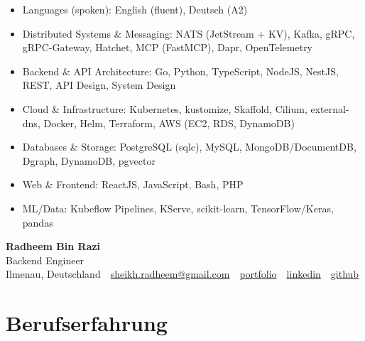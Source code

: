 \documentclass[10pt,a4paper]{resume}
\makeatletter
\newcommand{\Portfolio}{https://radheem.github.io/my-cv}
\newcommand{\PortfolioText}{portfolio}
\newcommand{\GitHub}{https://github.com/radheem}
\newcommand{\LinkedIn}{https://www.linkedin.com/in/radheem-razi}
\newcommand{\Email}{sheikh.radheem@gmail.com}
\makeatother
\begin{document}
\begin{itemize}[leftmargin=1.4em,nosep,topsep=2pt]
  \item Languages (spoken): English (fluent), Deutsch (A2)
  \item Distributed Systems \& Messaging: NATS (JetStream + KV), Kafka, gRPC, gRPC-Gateway, Hatchet, MCP (FastMCP), Dapr, OpenTelemetry
  \item Backend \& API Architecture: Go, Python, TypeScript, NodeJS, NestJS, REST, API Design, System Design
  \item Cloud \& Infrastructure: Kubernetes, kustomize, Skaffold, Cilium, external-dns, Docker, Helm, Terraform, AWS (EC2, RDS, DynamoDB)
  \item Databases \& Storage: PostgreSQL (sqlc), MySQL, MongoDB/DocumentDB, Dgraph, DynamoDB, pgvector
  \item Web \& Frontend: ReactJS, JavaScript, Bash, PHP
  \item ML/Data: Kubeflow Pipelines, KServe, scikit-learn, TensorFlow/Keras, pandas
\end{itemize}

\clearpage
{}

\begin{center}
  {\huge\bfseries Radheem Bin Razi}\\[3pt]
  {\large Backend Engineer}\\[6pt]
  \small
  Ilmenau, Deutschland \,\textbar\,
  \href{mailto:\Email}{\Email} \,\textbar\,
  \href{\Portfolio}{\PortfolioText} \,\textbar\,
  \href{\LinkedIn}{linkedin} \,\textbar\,
  \href{\GitHub}{github}
\end{center}
\vspace{2pt}

\section{Berufserfahrung}
\end{document}
